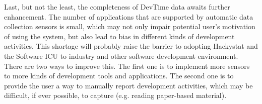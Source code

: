 Last, but not the least, the completeness of DevTime data awaits further enhancement. The number of applications that are supported by automatic data collection sensors is small, which may not only impair potential user's motivation of using the system, but also lead to bias in different kinds of development activities. This shortage will probably raise the barrier to adopting Hackystat and the Software ICU to industry and other software development environment. There are two ways to improve this. The first one is to implement more sensors to more kinds of development tools and applications. The second one is to provide the user a way to manually report development activities, which may be difficult, if ever possible, to capture (e.g. reading paper-based material).


